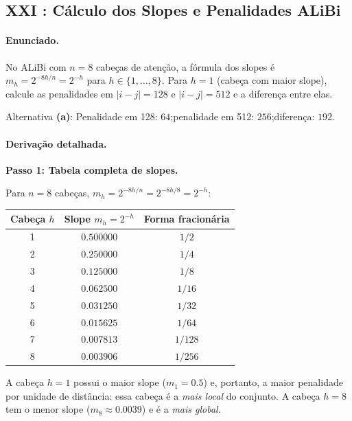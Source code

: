 \documentclass{dlproblemset}
\begin{document}
\subsection*{XXI {\mdseries{}}: Cálculo dos Slopes e Penalidades ALiBi}

\paragraph{Enunciado.}
No ALiBi com $n = 8$ cabeças de atenção, a fórmula dos slopes é
$m_h = 2^{-8h/n} = 2^{-h}$ para $h \in \{1,\ldots,8\}$.
Para $h = 1$ (cabeça com maior slope), calcule as penalidades em $|i-j| = 128$
e $|i-j| = 512$ e a diferença entre elas.

\begin{respostabox}
Alternativa \textbf{(a)}: Penalidade em 128: $64$;\quad penalidade em 512: $256$;\quad diferença: $192$.
\end{respostabox}

\paragraph{Derivação detalhada.}

\textbf{Passo 1: Tabela completa de slopes.}

Para $n = 8$ cabeças, $m_h = 2^{-8h/n} = 2^{-8h/8} = 2^{-h}$:

\begin{center}
\begin{tabular}{ccc}
\toprule
Cabeça $h$ & Slope $m_h = 2^{-h}$ & Forma fracionária \\
\midrule
1 & $0.500000$ & $1/2$ \\
2 & $0.250000$ & $1/4$ \\
3 & $0.125000$ & $1/8$ \\
4 & $0.062500$ & $1/16$ \\
5 & $0.031250$ & $1/32$ \\
6 & $0.015625$ & $1/64$ \\
7 & $0.007813$ & $1/128$ \\
8 & $0.003906$ & $1/256$ \\
\bottomrule
\end{tabular}
\end{center}

\medskip
A cabeça $h = 1$ possui o maior slope ($m_1 = 0.5$) e, portanto, a maior
penalidade por unidade de distância: essa cabeça é a \emph{mais local} do conjunto.
A cabeça $h = 8$ tem o menor slope ($m_8 \approx 0.0039$) e é a \emph{mais global}.
\end{document}
